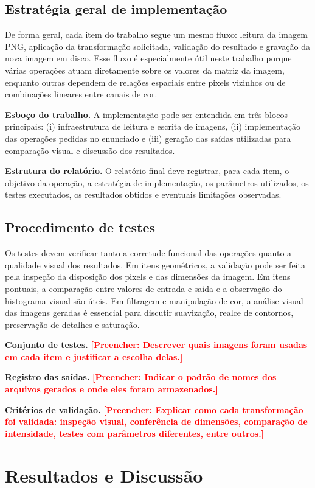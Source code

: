 \documentclass[12pt,a4paper]{article}
\newcommand{\placeholder}[1]{\textcolor{red}{\textbf{[Preencher: #1]}}}
\newcommand{\campo}[2]{\textbf{#1.} #2\par}
\begin{document}
\subsection{Estratégia geral de implementação}

De forma geral, cada item do trabalho segue um mesmo fluxo: leitura da imagem PNG, aplicação da transformação solicitada, validação do resultado e gravação da nova imagem em disco. Esse fluxo é especialmente útil neste trabalho porque várias operações atuam diretamente sobre os valores da matriz da imagem, enquanto outras dependem de relações espaciais entre pixels vizinhos ou de combinações lineares entre canais de cor.

\campo{Esboço do trabalho}{A implementação pode ser entendida em três blocos principais: (i) infraestrutura de leitura e escrita de imagens, (ii) implementação das operações pedidas no enunciado e (iii) geração das saídas utilizadas para comparação visual e discussão dos resultados.}
\campo{Estrutura do relatório}{O relatório final deve registrar, para cada item, o objetivo da operação, a estratégia de implementação, os parâmetros utilizados, os testes executados, os resultados obtidos e eventuais limitações observadas.}

\subsection{Procedimento de testes}

Os testes devem verificar tanto a corretude funcional das operações quanto a qualidade visual dos resultados. Em itens geométricos, a validação pode ser feita pela inspeção da disposição dos pixels e das dimensões da imagem. Em itens pontuais, a comparação entre valores de entrada e saída e a observação do histograma visual são úteis. Em filtragem e manipulação de cor, a análise visual das imagens geradas é essencial para discutir suavização, realce de contornos, preservação de detalhes e saturação.

\campo{Conjunto de testes}{\placeholder{Descrever quais imagens foram usadas em cada item e justificar a escolha delas.}}
\campo{Registro das saídas}{\placeholder{Indicar o padrão de nomes dos arquivos gerados e onde eles foram armazenados.}}
\campo{Critérios de validação}{\placeholder{Explicar como cada transformação foi validada: inspeção visual, conferência de dimensões, comparação de intensidade, testes com parâmetros diferentes, entre outros.}}

\section{Resultados e Discussão}
\end{document}
